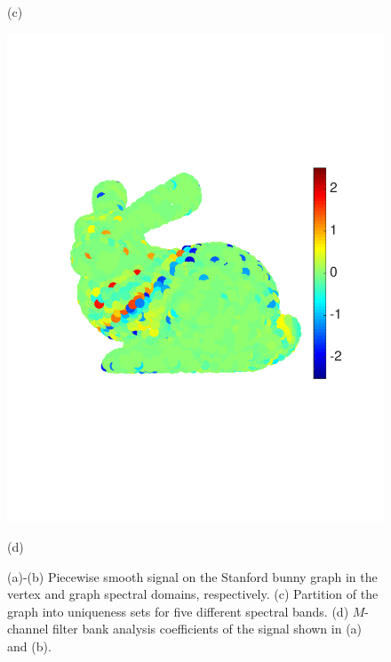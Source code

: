\documentclass{article}
\begin{document}
\begin{figure}[tbh]
\begin{minipage}[m]{0.48\linewidth}
\centerline{\small{(c)}}
\end{minipage}
\begin{minipage}[m]{0.48\linewidth}
\centerline{\includegraphics[width=.8\linewidth]{fig_bunny_coef_all}}
\centerline{\small{(d)}}
\end{minipage}
\caption{(a)-(b) Piecewise smooth signal on the Stanford bunny graph \cite{bunny} in the vertex and graph spectral domains, respectively. (c) Partition of the graph into uniqueness sets for five different spectral bands. (d) $M$-channel filter bank analysis coefficients of the signal shown in (a) and (b).}\label{Fig:bunny_signal}
\end{figure}
\end{document}
